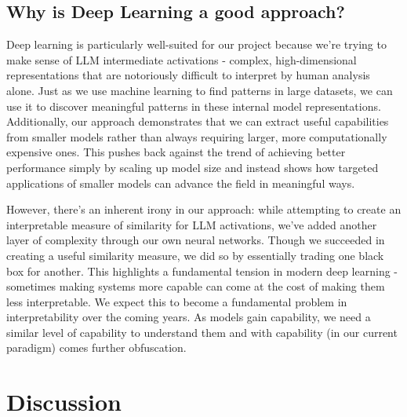 \documentclass{article}
\begin{document}
\subsection{Why is Deep Learning a good approach?}
Deep learning is particularly well-suited for our project because we're trying to make sense of LLM intermediate activations - complex, high-dimensional representations that are notoriously difficult to interpret by human analysis alone. Just as we use machine learning to find patterns in large datasets, we can use it to discover meaningful patterns in these internal model representations. Additionally, our approach demonstrates that we can extract useful capabilities from smaller models rather than always requiring larger, more computationally expensive ones. This pushes back against the trend of achieving better performance simply by scaling up model size and instead shows how targeted applications of smaller models can advance the field in meaningful ways.

However, there's an inherent irony in our approach: while attempting to create an interpretable measure of similarity for LLM activations, we've added another layer of complexity through our own neural networks. Though we succeeded in creating a useful similarity measure, we did so by essentially trading one black box for another. This highlights a fundamental tension in modern deep learning - sometimes making systems more capable can come at the cost of making them less interpretable. We expect this to become a fundamental problem in interpretability over the coming years. As models gain capability, we need a similar level of capability to understand them and with capability (in our current paradigm) comes further obfuscation.

\section{Discussion}
\end{document}
